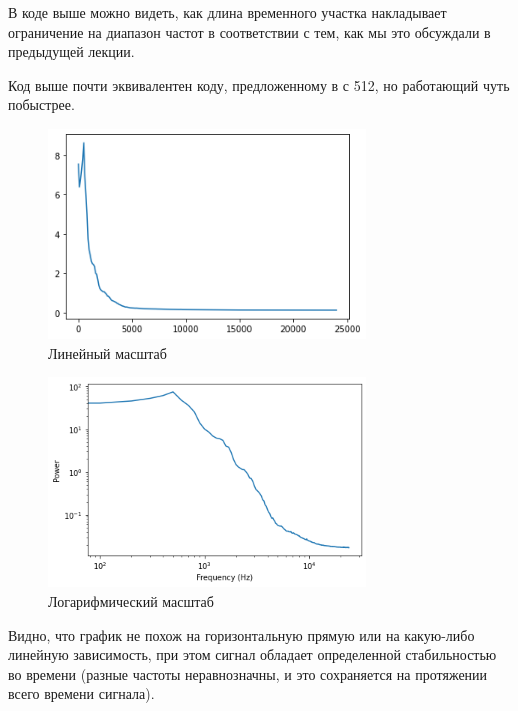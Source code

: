 \documentclass[a4paper,12pt]{report}
\begin{document}
    В коде выше можно видеть, как длина временного участка накладывает ограничение на диапазон частот в соответствии с тем, как мы это обсуждали в предыдущей лекции.
    
    Код выше почти эквивалентен коду, предложенному в  с  512, но работающий чуть побыстрее.
    
    \begin{figure}[H]
        \centering
        \includegraphics[width=0.75\textwidth]{ex2_average_powers_linear}
        \caption{Линейный масштаб}
        \label{fig:ex2_average_powers_linear}
    \end{figure}
    
    \begin{figure}[H]
        \centering
        \includegraphics[width=0.75\textwidth]{ex2_average_powers_loglog}
        \caption{Логарифмический масштаб}
        \label{fig:ex2_average_powers_loglog}
    \end{figure}
    
    Видно, что график не похож на горизонтальную прямую или на какую-либо линейную зависимость, при этом сигнал обладает определенной стабильностью во времени (разные частоты неравнозначны, и это сохраняется на протяжении всего времени сигнала).
    
\end{document}
